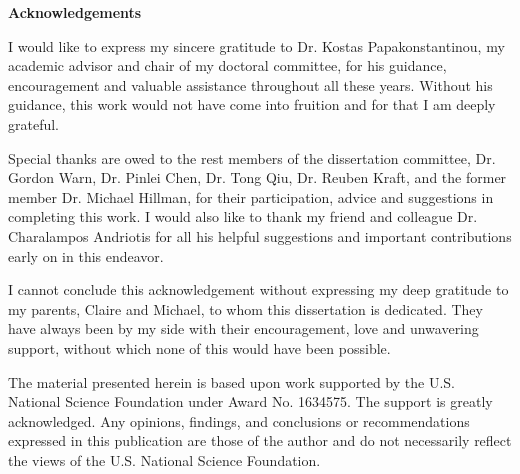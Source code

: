 \clearpage
{}
\begin{center}
\textbf{\Large Acknowledgements}\\
\vspace{\baselineskip}
\end{center}

I would like to express my sincere gratitude to Dr. Kostas Papakonstantinou, my 
academic advisor and chair of my doctoral committee, for his guidance, 
encouragement and valuable assistance throughout all these years. Without 
his guidance, this work would not have come into fruition and for that I am 
deeply grateful.

Special thanks are owed to the rest members of the dissertation committee, Dr. 
Gordon Warn, Dr. Pinlei Chen, Dr. Tong Qiu, Dr. Reuben Kraft, and the former 
member Dr. Michael Hillman, for their 
participation, advice and suggestions in completing this work. I would also 
like to thank my friend and colleague Dr. Charalampos Andriotis for all his 
helpful suggestions and important contributions early on in this endeavor.

I cannot conclude this acknowledgement without expressing my deep gratitude to 
my parents, Claire and Michael, to whom this dissertation is dedicated. They  
have always been by my side with their encouragement, love and unwavering 
support, without which none of this would have been possible.

The material presented herein is based upon work supported by the U.S. National 
Science Foundation under Award No. 1634575. The support is greatly 
acknowledged. Any opinions, findings, and conclusions or recommendations 
expressed in this publication are those of the author and do not necessarily 
reflect the views of the U.S. National Science Foundation.
\clearpage
